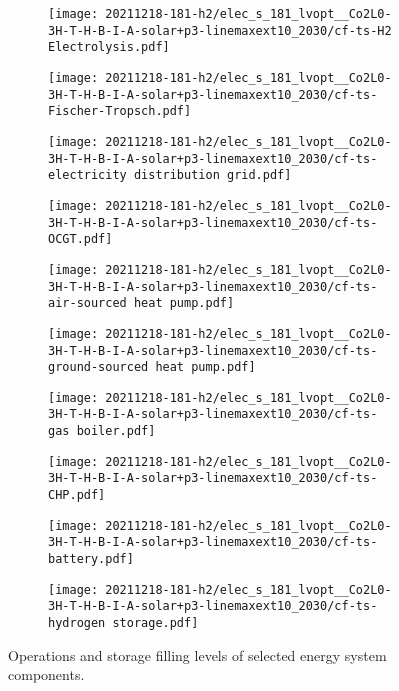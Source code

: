 \begin{figure}
    \begin{subfigure}{0.49\textwidth}
        \centering
        \texttt{[image: 20211218-181-h2/elec\_s\_181\_lvopt\_\_Co2L0-3H-T-H-B-I-A-solar+p3-linemaxext10\_2030/cf-ts-H2 Electrolysis.pdf]}
    \end{subfigure}
    \begin{subfigure}{0.49\textwidth}
        \centering
        \texttt{[image: 20211218-181-h2/elec\_s\_181\_lvopt\_\_Co2L0-3H-T-H-B-I-A-solar+p3-linemaxext10\_2030/cf-ts-Fischer-Tropsch.pdf]}
    \end{subfigure}
    \begin{subfigure}{0.49\textwidth}
        \centering
        \texttt{[image: 20211218-181-h2/elec\_s\_181\_lvopt\_\_Co2L0-3H-T-H-B-I-A-solar+p3-linemaxext10\_2030/cf-ts-electricity distribution grid.pdf]}
    \end{subfigure}
    \begin{subfigure}{0.49\textwidth}
        \centering
        \texttt{[image: 20211218-181-h2/elec\_s\_181\_lvopt\_\_Co2L0-3H-T-H-B-I-A-solar+p3-linemaxext10\_2030/cf-ts-OCGT.pdf]}
    \end{subfigure}
    \begin{subfigure}{0.49\textwidth}
        \centering
        \texttt{[image: 20211218-181-h2/elec\_s\_181\_lvopt\_\_Co2L0-3H-T-H-B-I-A-solar+p3-linemaxext10\_2030/cf-ts-air-sourced heat pump.pdf]}
    \end{subfigure}
    \begin{subfigure}{0.49\textwidth}
        \centering
        \texttt{[image: 20211218-181-h2/elec\_s\_181\_lvopt\_\_Co2L0-3H-T-H-B-I-A-solar+p3-linemaxext10\_2030/cf-ts-ground-sourced heat pump.pdf]}
    \end{subfigure}
    \begin{subfigure}{0.49\textwidth}
        \centering
        \texttt{[image: 20211218-181-h2/elec\_s\_181\_lvopt\_\_Co2L0-3H-T-H-B-I-A-solar+p3-linemaxext10\_2030/cf-ts-gas boiler.pdf]}
    \end{subfigure}
    \begin{subfigure}{0.49\textwidth}
        \centering
        \texttt{[image: 20211218-181-h2/elec\_s\_181\_lvopt\_\_Co2L0-3H-T-H-B-I-A-solar+p3-linemaxext10\_2030/cf-ts-CHP.pdf]}
    \end{subfigure}
    \begin{subfigure}{0.49\textwidth}
        \centering
        \texttt{[image: 20211218-181-h2/elec\_s\_181\_lvopt\_\_Co2L0-3H-T-H-B-I-A-solar+p3-linemaxext10\_2030/cf-ts-battery.pdf]}
    \end{subfigure}
    \begin{subfigure}{0.49\textwidth}
        \centering
        \texttt{[image: 20211218-181-h2/elec\_s\_181\_lvopt\_\_Co2L0-3H-T-H-B-I-A-solar+p3-linemaxext10\_2030/cf-ts-hydrogen storage.pdf]}
    \end{subfigure}
    \caption{Operations and storage filling levels of selected energy system components.}
    \label{fig:si:utilisation-rate-ts}
\end{figure}


